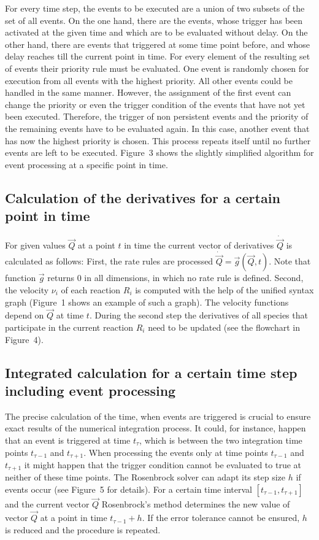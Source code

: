\documentclass[10pt]{bmc_article}
\newenvironment{bmcformat}{\baselineskip20pt\sloppy\setboolean{publ}{false}}{\baselineskip20pt\sloppy}
\begin{document}
\begin{bmcformat}
For every time step, the events to be executed are a union of two subsets of the set of all events.
On the one hand, there are the events, whose trigger has been activated at the given time and which are to be evaluated without delay.
On the other hand, there are events that triggered at some time point before, and whose delay reaches till the current point in time.
For every element of the resulting set of events their priority rule must be evaluated.
One event is randomly chosen for execution from all events with the highest priority.
All other events could be handled in the same manner.
However, the assignment of the first event can change the priority or even the trigger condition of the events that have not yet been executed.
Therefore, the trigger of non persistent events and the priority of the remaining events have to be evaluated again.
In this case, another event that has now the highest priority is chosen.
This process repeats itself until no further events are left to be executed.
Figure~3 shows the slightly simplified algorithm for event processing at a specific point in time.

\subsection*{Calculation of the derivatives for a certain point in time}
For given values $\vec{Q}$ at a point $t$ in time the current vector of derivatives $\dot{\vec{Q}}$ is calculated as follows:
First, the rate rules are processed $\dot{\vec{Q}} = \vec{g}(\vec{Q}, t)$. Note that function $\vec{g}$ returns 0 in all dimensions,
in which no rate rule is defined.
Second, the velocity $\nu_i$ of each reaction $R_i$ is computed with the help of the unified syntax graph (Figure~1 shows an example of such a graph).
The velocity functions depend on $\vec{Q}$ at time $t$.
During the second step the derivatives of all species that participate in the current reaction $R_i$ need to be updated (see the flowchart in Figure~4).

\subsection*{Integrated calculation for a certain time step including event processing}
The precise calculation of the time, when events are triggered is crucial to ensure exact results of the numerical integration process.
It could, for instance, happen that an event is triggered at time $t_{\tau}$, which is between the two integration time points $t_{\tau - 1}$ and $t_{\tau + 1}$.
When processing the events only at time points $t_{\tau - 1}$ and $t_{\tau + 1}$ it might happen that the trigger condition cannot be evaluated to true at neither of these time points. 
The Rosenbrock solver \cite{Press1993} can adapt its step size $h$ if events occur (see Figure~5 for details).
For a certain time interval $[t_{\tau - 1}, t_{\tau + 1}]$ and the current vector $\vec{Q}$ Rosenbrock's method determines the new value of vector $\vec{Q}$ at a point in time $t_{\tau - 1} + h$.
If the error tolerance cannot be ensured, $h$ is reduced and the procedure is repeated.


\end{bmcformat}
\end{document}
